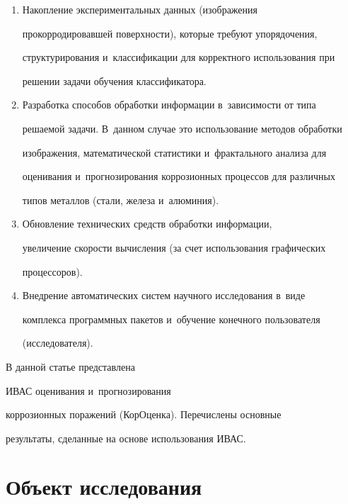    \begin{enumerate}[1.]


   \item Накопление экспериментальных данных (изображения 


прокорродировавшей поверхности), которые требуют упорядочения, 


структурирования и~классификации для корректного использования при 


решении задачи обучения классификатора.


\item Разработка способов обработки информации в~зависимости от типа 


решаемой задачи. В~данном случае это использование методов обработки 


изображения, математической статистики и~фрактального анализа для 


оценивания и~прогнозирования коррозионных процессов для различных 


типов металлов (стали, железа и~алюминия).


   \item Обновление технических средств обработки информации, 


увеличение скорости вычисления (за счет использования графических 


процессоров).


   \item Внедрение автоматических систем научного исследования в~виде 


комплекса программных пакетов и~обучение конечного пользователя 


(исследователя).


   \end{enumerate}


   


   В данной статье представлена 


ИВАС оценивания и~прогнозирования 


коррозионных поражений (КорОценка). Перечислены основные 


результаты, сделанные на основе использования ИВАС.


   


\section{Объект исследования}


